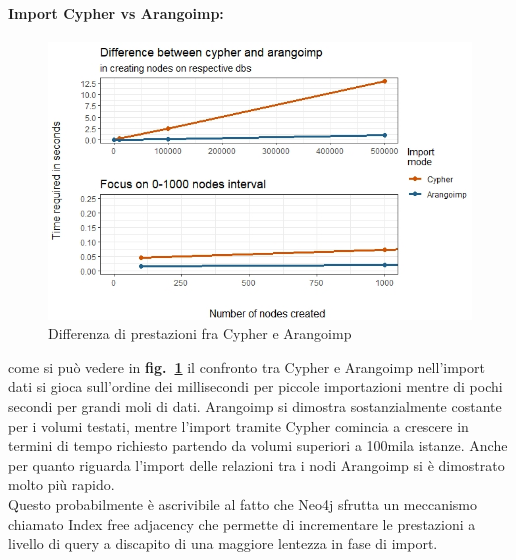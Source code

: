 \documentclass[fleqn,10pt]{SelfArx} %
\begin{document}
{{\paragraph{Import Cypher vs Arangoimp:}
\begin{figure}
\centering
\includegraphics[scale=0.54]{viz_benchmark_cypher_arangoimp.jpeg}
\vspace*{0.01cm}
\caption{\footnotesize \label{plot_cypher_arangoimp} Differenza di prestazioni fra Cypher e Arangoimp}
\end{figure}
come si può vedere in \textbf{fig.~\ref{plot_cypher_arangoimp}} il confronto tra Cypher e Arangoimp nell'import dati si gioca sull'ordine dei millisecondi per piccole importazioni mentre di pochi secondi per grandi moli di dati. 
Arangoimp si dimostra sostanzialmente costante per i volumi testati, mentre l'import tramite Cypher comincia a crescere in termini di tempo richiesto partendo da volumi superiori a 100mila istanze. 
Anche per quanto riguarda l'import delle relazioni tra i nodi Arangoimp si è dimostrato molto più rapido. \\
Questo probabilmente è ascrivibile al fatto che Neo4j sfrutta un meccanismo chiamato Index free adjacency che permette di incrementare le prestazioni a livello di query a discapito di una maggiore lentezza in fase di import. 
}}
\end{document}
